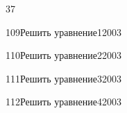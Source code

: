 \begin{TrigSourcePage}{37}
\begin{TrigExercise}{109}{Решить уравнение}{1}{2003}
\end{TrigExercise}
\begin{TrigExercise}{110}{Решить уравнение}{2}{2003}
\end{TrigExercise}
\begin{TrigExercise}{111}{Решить уравнение}{3}{2003}
\end{TrigExercise}
\begin{TrigExercise}{112}{Решить уравнение}{4}{2003}
\end{TrigExercise}
\end{TrigSourcePage}

